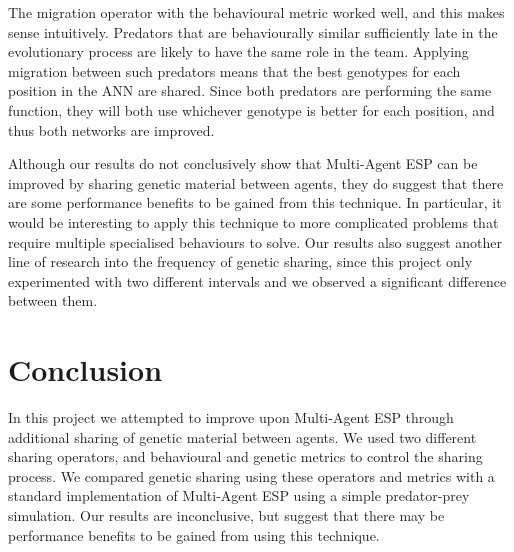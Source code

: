\documentclass[12pt]{article} %
\begin{document}
The migration operator with the behavioural metric worked well, and this makes sense intuitively. Predators that are behaviourally similar sufficiently late in the evolutionary process are likely to have the same role in the team. Applying migration between such predators means that the best genotypes for each position in the ANN are shared. Since both predators are performing the same function, they will both use whichever genotype is better for each position, and thus both networks are improved.

Although our results do not conclusively show that Multi-Agent ESP can be improved by sharing genetic material between agents, they do suggest that there are some performance benefits to be gained from this technique. In particular, it would be interesting to apply this technique to more complicated problems that require multiple specialised behaviours to solve. Our results also suggest another line of research into the frequency of genetic sharing, since this project only experimented with two different intervals and we observed a significant difference between them.

\section{Conclusion}

In this project we attempted to improve upon Multi-Agent ESP through additional sharing of genetic material between agents. We used two different sharing operators, and behavioural and genetic metrics to control the sharing process. We compared genetic sharing using these operators and metrics with a standard implementation of Multi-Agent ESP using a simple predator-prey simulation. Our results are inconclusive, but suggest that there may be performance benefits to be gained from using this technique.

{}

\end{document}
